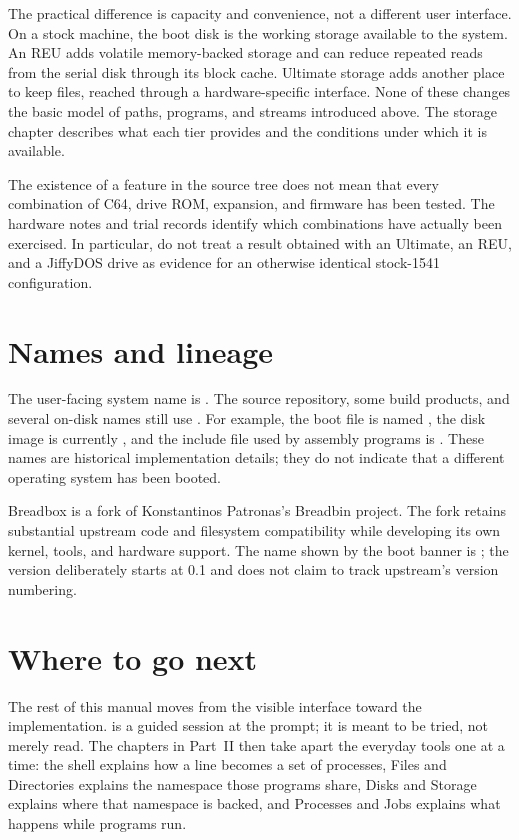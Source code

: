 The practical difference is capacity and convenience, not a different user interface. On a stock machine, the boot disk is the working storage available to the system. An REU adds volatile memory-backed storage and can reduce repeated reads from the serial disk through its block cache. Ultimate storage adds another place to keep files, reached through a hardware-specific interface. None of these changes the basic model of paths, programs, and streams introduced above. The storage chapter describes what each tier provides and the conditions under which it is available.

\begin{platformnote}
The existence of a feature in the source tree does not mean that every combination of C64, drive ROM, expansion, and firmware has been tested. The hardware notes and trial records identify which combinations have actually been exercised. In particular, do not treat a result obtained with an Ultimate, an REU, and a JiffyDOS drive as evidence for an otherwise identical stock-1541 configuration.
\end{platformnote}

\section{Names and lineage}

The user-facing system name is \Breadbox. The source repository, some build products, and several on-disk names still use \Breadbin. For example, the boot file is named , the disk image is currently , and the include file used by assembly programs is . These names are historical implementation details; they do not indicate that a different operating system has been booted.

Breadbox is a fork of Konstantinos Patronas's Breadbin project. The fork retains substantial upstream code and filesystem compatibility while developing its own kernel, tools, and hardware support. The name shown by the boot banner is ; the version deliberately starts at 0.1 and does not claim to track upstream's version numbering.

\section{Where to go next}

The rest of this manual moves from the visible interface toward the implementation.  is a guided session at the prompt; it is meant to be tried, not merely read. The chapters in Part~II then take apart the everyday tools one at a time: the shell explains how a line becomes a set of processes, Files and Directories explains the namespace those programs share, Disks and Storage explains where that namespace is backed, and Processes and Jobs explains what happens while programs run.

